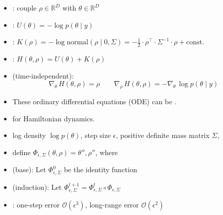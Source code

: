 \documentclass[10pt]{report}
\begin{document}
\begin{itemize}
\item {}: couple  $\rho \in
  \mathbb{R}^D$ with  $\theta \in \mathbb{R}^D$
\item {}: $U(\theta) = -\log p(\theta \mid y)$
\item {}: $K(\rho) = -\log \textrm{normal}(\rho
  \mid 0, \Sigma) = -\frac{1}{2} \cdot \rho^{\top} \cdot \Sigma^{-1} \cdot
  \rho + \textrm{const.}$
\item {}: $H(\theta, \rho) = U(\theta) + K(\rho)$
\item {} (time-independent):
  $$
  \nabla_\theta \, H(\theta, \rho) = \rho
  \qquad
  \nabla_\rho \, H(\theta, \rho) = -\nabla_{\theta} \, \log
  p(\theta \mid y)
  $$
\item These ordinary differential equations (ODE) can be .
\end{itemize}

\begin{itemize}
\item {} for Hamiltonian dynamics.
\item {} log density $\log p(\theta)$, step size
  $\epsilon$, positive definite mass matrix $\Sigma$, 
\item define  $\Phi_{\epsilon, \Sigma}(\theta, \rho) = \theta'', \rho''$, where
\item {} (base): Let $\Phi^0_{\epsilon, \Sigma}$ be the identity function
\item {} (induction): Let $\Phi^{t +
    1}_{\epsilon, \Sigma} = \Phi^t_{\epsilon,\Sigma} \circ
  \Phi_{\epsilon,\Sigma}$
\item {}: one-step error $\mathcal{O}(\epsilon^3)$, long-range error $\mathcal{O}(\epsilon^2)$
\end{itemize}
\end{document}
